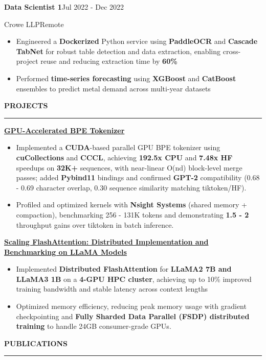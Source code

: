 \documentclass[9pt]{article}
\newcommand{\resumeSection}[1]{%
  \vspace{2pt}%
  \textbf{#1}\par
  \vspace{-5pt}%
  \rule{\linewidth}{0.3pt}\par
  \vspace{0pt}%
}
\newcommand{\resumeRole}[4]{%
  \textbf{#1}\hfill #2\par
  #3\hfill #4\par
}
\newcommand{\kw}[1]{\textbf{#1}}
\begin{document}
\vspace{0pt}
\resumeRole{Data Scientist 1}{Jul 2022 - Dec 2022}{Crowe LLP}{Remote}
\begin{itemize}
  \item Engineered a \kw{Dockerized} Python service using \kw{PaddleOCR} and \kw{Cascade TabNet} for robust table detection and data extraction, enabling cross-project reuse and reducing extraction time by \kw{60\%}
  \item Performed \kw{time-series forecasting} using \kw{XGBoost} and \kw{CatBoost} ensembles to predict metal demand across multi-year datasets
\end{itemize}

\resumeSection{PROJECTS}

\textbf{\href{https://github.com/venugopalkadamba/gpu-tokenizer}{GPU-Accelerated BPE Tokenizer}}\par
\begin{itemize}
  \item Implemented a \kw{CUDA}-based parallel GPU BPE tokenizer using \kw{cuCollections} and \kw{CCCL}, achieving \kw{192.5x CPU} and \kw{7.48x HF} speedups on \kw{32K+} sequences, with near-linear O(nd) block-level merge passes; added \kw{Pybind11} bindings and confirmed \kw{GPT-2} compatibility (0.68 - 0.69 character overlap, 0.30 sequence similarity matching tiktoken/HF).
  \item Profiled and optimized kernels with \kw{Nsight Systems} (shared memory + compaction), benchmarking 256 - 131K tokens and demonstrating \kw{1.5 - 2\texttimes{}} throughput gains over tiktoken in batch inference.
\end{itemize}

\textbf{\href{https://github.com/venugopalkadamba/hpml-final-project}{Scaling FlashAttention: Distributed Implementation and Benchmarking on LLaMA Models}}\par
\begin{itemize}
  \item Implemented \kw{Distributed FlashAttention} for \kw{LLaMA2 7B and LLaMA3 1B} on a \kw{4-GPU HPC cluster}, achieving up to 10\% improved training bandwidth and stable latency across context lengths
  \item Optimized memory efficiency, reducing peak memory usage with gradient checkpointing and \kw{Fully Sharded Data Parallel (FSDP) distributed training} to handle 24GB consumer-grade GPUs.
\end{itemize}

\resumeSection{PUBLICATIONS}
\end{document}
